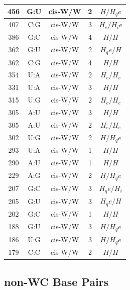 \begin{center}
\begin{longtable}{c|c|c|c|c}
456 & G:U & cis-W/W & 2 & $H/H_qe$ \\ \hline
407 & C:G & cis-W/W & 3 & $H_e/H_ie$ \\ \hline
386 & G:C & cis-W/W & 4 & $H/H$ \\ \hline
362 & G:U & cis-W/W & 2 & $H_qe/H$ \\ \hline
362 & C:G & cis-W/W & 4 & $H/H$ \\ \hline
354 & U:A & cis-W/W & 2 & $H_e/H_e$ \\ \hline
331 & U:A & cis-W/W & 3 & $H/H$ \\ \hline
315 & U:G & cis-W/W & 2 & $H_e/H_e$ \\ \hline
305 & A:U & cis-W/W & 3 & $H/H$ \\ \hline
305 & A:U & cis-W/W & 2 & $H_e/H_e$ \\ \hline
302 & U:G & cis-W/W & 2 & $H/H_qe$ \\ \hline
293 & U:A & cis-W/W & 1 & $H/H$ \\ \hline
290 & A:U & cis-W/W & 1 & $H/H$ \\ \hline
229 & A:G & cis-W/W & 2 & $H/H_qe$ \\ \hline
207 & G:C & cis-W/W & 3 & $H_qe/H_i$ \\ \hline
205 & G:U & cis-W/W & 3 & $H_qe/H$ \\ \hline
202 & G:C & cis-W/W & 1 & $H/H$ \\ \hline
188 & G:U & cis-W/W & 3 & $H/H_qe$ \\ \hline
186 & U:G & cis-W/W & 3 & $H/H_qe$ \\ \hline
179 & C:C & cis-W/W & 2 & $H/H$ \\ \hline


\end{longtable}
\end{center}


\subsection{non-WC Base Pairs}


